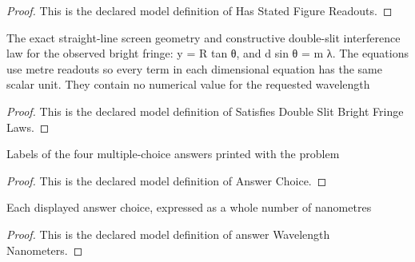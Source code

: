 \begin{proof}
  This is the declared model definition of Has Stated Figure Readouts.
\end{proof}
\begin{definition}
  \label{def:physics:phyx-mini-0046:phyxminiproblems-problemphyxmini0046-satisfiesdoubleslitbrightfringelaws}
  The exact straight-line screen geometry and constructive double-slit interference law for the observed bright fringe: y = R tan θ, and d sin θ = m λ. The equations use metre readouts so every term in each dimensional equation has the same scalar unit. They contain no numerical value for the requested wavelength
\end{definition}
\begin{proof}
  This is the declared model definition of Satisfies Double Slit Bright Fringe Laws.
\end{proof}
\begin{definition}
  \label{def:physics:phyx-mini-0046:phyxminiproblems-problemphyxmini0046-answerchoice}
  Labels of the four multiple-choice answers printed with the problem
\end{definition}
\begin{proof}
  This is the declared model definition of Answer Choice.
\end{proof}
\begin{definition}
  \label{def:physics:phyx-mini-0046:phyxminiproblems-problemphyxmini0046-answerwavelengthnanometers}
  Each displayed answer choice, expressed as a whole number of nanometres
\end{definition}
\begin{proof}
  This is the declared model definition of answer Wavelength Nanometers.
\end{proof}
